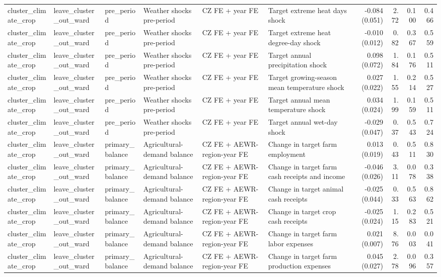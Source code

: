 \begin{tabular}{llllllrrrr}
cluster_climate_crop & leave_cluster_out_ward & pre_period & Weather shocks pre-period & CZ FE + year FE & Target extreme heat days shock & -0.084 (0.051) & 2.72 & 0.100 & 0.466 \\
cluster_climate_crop & leave_cluster_out_ward & pre_period & Weather shocks pre-period & CZ FE + year FE & Target extreme heat degree-day shock & -0.010 (0.012) & 0.82 & 0.367 & 0.559 \\
cluster_climate_crop & leave_cluster_out_ward & pre_period & Weather shocks pre-period & CZ FE + year FE & Target annual precipitation shock & 0.098 (0.072) & 1.84 & 0.176 & 0.511 \\
cluster_climate_crop & leave_cluster_out_ward & pre_period & Weather shocks pre-period & CZ FE + year FE & Target growing-season mean temperature shock & 0.027 (0.022) & 1.55 & 0.214 & 0.527 \\
cluster_climate_crop & leave_cluster_out_ward & pre_period & Weather shocks pre-period & CZ FE + year FE & Target annual mean temperature shock & 0.034 (0.024) & 1.99 & 0.159 & 0.511 \\
cluster_climate_crop & leave_cluster_out_ward & pre_period & Weather shocks pre-period & CZ FE + year FE & Target annual wet-day shock & -0.029 (0.047) & 0.37 & 0.543 & 0.724 \\
cluster_climate_crop & leave_cluster_out_ward & primary_balance & Agricultural-demand balance & CZ FE + AEWR-region-year FE & Change in target farm employment & 0.013 (0.019) & 0.43 & 0.511 & 0.830 \\
cluster_climate_crop & leave_cluster_out_ward & primary_balance & Agricultural-demand balance & CZ FE + AEWR-region-year FE & Change in target farm cash receipts and income & -0.046 (0.026) & 3.11 & 0.078 & 0.338 \\
cluster_climate_crop & leave_cluster_out_ward & primary_balance & Agricultural-demand balance & CZ FE + AEWR-region-year FE & Change in target animal cash receipts & -0.025 (0.044) & 0.33 & 0.563 & 0.862 \\
cluster_climate_crop & leave_cluster_out_ward & primary_balance & Agricultural-demand balance & CZ FE + AEWR-region-year FE & Change in target crop cash receipts & -0.025 (0.024) & 1.15 & 0.283 & 0.521 \\
cluster_climate_crop & leave_cluster_out_ward & primary_balance & Agricultural-demand balance & CZ FE + AEWR-region-year FE & Change in target farm labor expenses & 0.021 (0.007) & 8.76 & 0.003 & 0.041 \\
cluster_climate_crop & leave_cluster_out_ward & primary_balance & Agricultural-demand balance & CZ FE + AEWR-region-year FE & Change in target farm production expenses & 0.045 (0.027) & 2.78 & 0.096 & 0.357 \\

\end{tabular}

